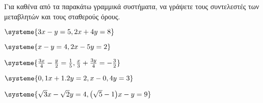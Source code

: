 Για καθένα από τα παρακάτω γραμμικά συστήματα, να γράψετε τους συντελεστές των μεταβλητών και τους σταθερούς όρους.
\begin{rlist}[leftmargin=5mm]
\begin{multicols}{2}
\item $ \systeme{3x-y=5,2x+4y=8} $
\item $ \systeme{x-y=4,2x-5y=2} $
\item $ \systeme{\frac{3x}{4}-\frac{y}{2}=\frac{1}{5},\frac{x}{3}+\frac{3y}{4}=-\frac{3}{2}} $
\item $ \systeme{{0,1}x+{1.2}y=2,x-{0,4}y=3} $
\end{multicols}
\item $ \systeme{\sqrt{3}x-\sqrt{2}y=4,{\left(\sqrt{5}-1\right)}x-y=9} $
\end{rlist}
